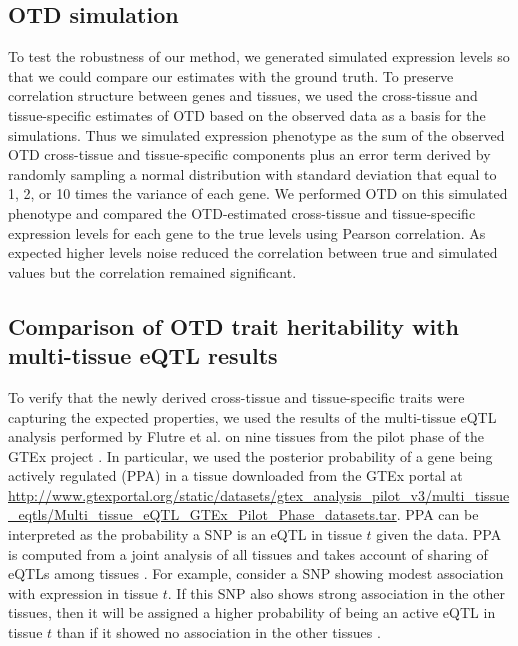 \documentclass[10pt,letterpaper]{article}
\begin{document}
\subsection*{OTD simulation}

To test the robustness of our method, we generated simulated expression levels so that we could compare our estimates with the ground truth. To preserve correlation structure between genes and tissues, we used the cross-tissue and tissue-specific estimates of OTD based on the observed data as a basis for the simulations. Thus we simulated expression phenotype as the sum of the observed OTD cross-tissue and tissue-specific components plus an error term derived by randomly sampling a normal distribution with standard deviation that equal to 1, 2, or 10 times the variance of each gene. We performed OTD on this simulated phenotype and compared the OTD-estimated cross-tissue and tissue-specific expression levels for each gene to the true levels using Pearson correlation. As expected higher levels noise reduced the correlation between true and simulated values but the correlation remained significant.

\subsection*{Comparison of OTD trait heritability with multi-tissue eQTL
results}\label{comparison-of-otd-pve-to-multi-tissue-eqtl-results}

To verify that the newly derived cross-tissue and tissue-specific traits were capturing the expected properties, we used the results of the multi-tissue eQTL analysis performed by Flutre et al. \cite{Flutre_2013}
on nine tissues from the pilot phase of the GTEx project \cite{Ardlie_2015}. %
In particular, we used the posterior probability of a gene being actively regulated (PPA) in a tissue downloaded from the GTEx portal at \url{http://www.gtexportal.org/static/datasets/gtex_analysis_pilot_v3/multi_tissue_eqtls/Multi_tissue_eQTL_GTEx_Pilot_Phase_datasets.tar}. PPA can be interpreted as
the probability a SNP is an eQTL in tissue \(t\) given the data. PPA is computed from a joint analysis of all tissues and takes account of sharing of eQTLs among tissues \cite{Flutre_2013}. For example, consider a SNP showing modest association with expression in tissue \(t\). If this SNP also shows strong association in the other tissues, then it will be assigned a higher probability of being an active eQTL in tissue \(t\) than if it showed no association in the other tissues \cite{Flutre_2013}.
\end{document}
